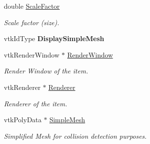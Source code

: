 \begin{DoxyCompactItemize}
\item 
\hypertarget{classvtkScenarioItem_a915d41b95816865b9b78e2073a1d7d73}{
double \hyperlink{classvtkScenarioItem_a915d41b95816865b9b78e2073a1d7d73}{ScaleFactor}}
\label{classvtkScenarioItem_a915d41b95816865b9b78e2073a1d7d73}

\begin{DoxyCompactList}\small\item\em Scale factor (size). \item\end{DoxyCompactList}\item 
\hypertarget{classvtkScenarioItem_a0eab54cacf6c48af77d85017368bfa3f}{
vtkIdType {\bfseries DisplaySimpleMesh}}
\label{classvtkScenarioItem_a0eab54cacf6c48af77d85017368bfa3f}

\item 
\hypertarget{classvtkScenarioItem_a23c0b3a217359ad91a865093fafaa4b4}{
vtkRenderWindow $\ast$ \hyperlink{classvtkScenarioItem_a23c0b3a217359ad91a865093fafaa4b4}{RenderWindow}}
\label{classvtkScenarioItem_a23c0b3a217359ad91a865093fafaa4b4}

\begin{DoxyCompactList}\small\item\em Render Window of the item. \item\end{DoxyCompactList}\item 
\hypertarget{classvtkScenarioItem_a3474fdd82bc9a699ada6238884890ef9}{
vtkRenderer $\ast$ \hyperlink{classvtkScenarioItem_a3474fdd82bc9a699ada6238884890ef9}{Renderer}}
\label{classvtkScenarioItem_a3474fdd82bc9a699ada6238884890ef9}

\begin{DoxyCompactList}\small\item\em Renderer of the item. \item\end{DoxyCompactList}\item 
\hypertarget{classvtkScenarioItem_a3438222b65bb2a271eeb2be1eaa109b2}{
vtkPolyData $\ast$ \hyperlink{classvtkScenarioItem_a3438222b65bb2a271eeb2be1eaa109b2}{SimpleMesh}}
\label{classvtkScenarioItem_a3438222b65bb2a271eeb2be1eaa109b2}

\begin{DoxyCompactList}\small\item\em Simplified Mesh for collision detection purposes. \item\end{DoxyCompactList}\end{DoxyCompactItemize}


